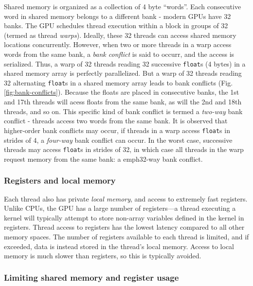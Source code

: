 Shared memory is organized as a collection of  4 byte ``words''.
Each consecutive word in shared memory belongs
to a different bank - modern GPUs have 32 banks.
The GPU schedules
thread execution within a block
in groups of 32 (termed as thread \emph{warps}).
Ideally, these 32 threads
can access shared memory locations concurrently.
However, when two or more threads in a warp access
words from the same bank,
a \emph{bank conflict} is said to occurr,
and the access is serialized.
Thus,
a warp of 32 threads reading
32 successive \texttt{float}s (4 bytes) in a shared memory array
is perfectly parallelized.
But a warp of 32 threads reading
32 alternating \texttt{float}s in a shared memory array
leads to bank conflicts (Fig. \ref{fig:bank-conflicts}).
Because the floats are placed in consecutive banks,
the 1st and 17th threads will acess floats from the same bank,
as will the 2nd and 18th threads, and so on.
This specific kind of bank conflict is termed a
\emph{two-way} bank conflict -
threads access two words from the same bank.
It is observed that higher-order bank conflicts may occur,
if threads in a warp access
\texttt{float}s in strides of 4,
a \emph{four-way} bank conflict can occur.
In the worst case, successive threads may access
\texttt{float}s in strides of 32,
in which case all threads in the warp
request memory from the same bank:
a emph{32-way} bank conflict.

\subsubsection{Registers and local memory}

Each thread also has private \emph{local memory},
and access to extremely fast registers.
Unlike CPUs, the GPU has a large number of registers---a
thread executing a kernel will
typically attempt to store
non-array variables defined in the kernel in registers.
Thread access to registers has the lowest latency
compared to all other memory spaces.
The number of registers available to each thread is limited,
and if exceeded,
data is instead stored in the thread's local memory.
Access to local memory is much slower than registers,
so this is typically avoided.

\subsubsection{Limiting shared memory and register usage}

